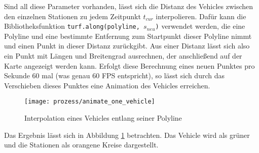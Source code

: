   Sind all diese Parameter vorhanden, lässt sich die Distanz des Vehicles zwischen den einzelnen Stationen zu jedem Zeitpunkt $t_{cur}$ interpolieren.
  Dafür kann die Bibliotheksfunktion \texttt{turf.along(polyline, $s_{neu}$)} verwendet werden, die eine Polyline und eine bestimmte Entfernung zum Startpunkt dieser Polyline nimmt und einen Punkt in dieser Distanz zurückgibt. Aus einer Distanz lässt sich also ein Punkt mit Längen und Breitengrad ausrechnen, der anschließend auf der Karte angezeigt werden kann. Erfolgt diese Berechnung eines neuen Punktes pro Sekunde 60 mal (was genau 60 FPS entspricht), so lässt sich durch das Verschieben dieses Punktes eine Animation des Vehicles erreichen. 

  \begin{figure}[htbp]
    \begin{center}
      \texttt{[image: prozess/animate\_one\_vehicle]}
      \caption{Interpolation eines Vehicles entlang seiner Polyline}
      \label{fig:prozess/animate_one_vehicle}
    \end{center}
  \end{figure} 

  Das Ergebnis lässt sich in Abbildung \ref{fig:prozess/animate_one_vehicle} betrachten. Das Vehicle wird als grüner und die Stationen als orangene Kreise dargestellt.
  
